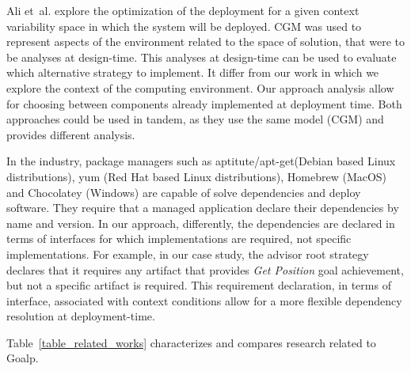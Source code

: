Ali et~al.\cite{ali_requirements-driven_2014} explore the optimization of the deployment for a given context variability space in which the system will be deployed. CGM was used to represent aspects of the environment related to the space of solution, that were to be analyses at design-time. This analyses at design-time can be used to evaluate which alternative strategy to implement.
It differ from our work in which we explore the context of the computing environment. Our approach analysis allow for choosing between components already implemented at deployment time. Both approaches could be used in tandem, as they use the same model (CGM) and provides different analysis.



In the industry, package managers such as aptitute/apt-get(Debian based Linux distributions), yum (Red Hat based Linux distributions), Homebrew (MacOS) and Chocolatey (Windows) are capable of solve dependencies and deploy software. They require that a managed application declare their dependencies by name and version. In our approach, differently, the dependencies are declared in terms of interfaces for which implementations are required, not specific implementations. For example, in our case study, the advisor root strategy declares that it requires any artifact that provides \emph{Get Position} goal achievement, but not a specific artifact is required.
This requirement declaration, in terms of interface, associated with context conditions allow for a more flexible dependency resolution at deployment-time.

Table~\ref{table_related_works} characterizes and compares research related to Goalp.

